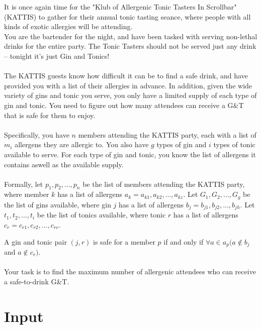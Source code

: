 

\noindent It is once again time for the "Klub of Allergenic Tonic Tasters In Scrollbar" (KATTIS) to gather for their annual tonic tasting seance, where people with all kinds of exotic allergies will be attending. 
\\
\noindent You are the bartender for the night, and have been tasked with serving non-lethal drinks for the entire party. 
The Tonic Tasters should not be served just any drink -- tonight it's just Gin and Tonics!
\\\\
\noindent The KATTIS guests know how difficult it can be to find a safe drink, and have provided you with a list of their allergies in advance.
In addition, given the wide variety of gins and tonic you serve, you only have a limited supply of each type of gin and tonic.
You need to figure out how many attendees can receive a G\&T that is safe for them to enjoy.
\\\\
\noindent Specifically, you have $n$ members attending the KATTIS party, each with a list of $m_i$ allergens they are allergic to.
You also have $g$ types of gin and $i$ types of tonic available to serve.
For each type of gin and tonic, you know the list of allergens it contains aswell as the available supply.
\\\\
\noindent Formally, let $p_1, p_2, \dots, p_n$ be the list of members attending the KATTIS party, 
where member $k$ has a list of allergens $a_k = a_{k1}, a_{k2}, \dots, a_{kz}$. 
Let $G_1, G_2, \dots, G_g$ be the list of gins available, 
where gin $j$ has a list of allergens $b_j = b_{j1}, b_{j2}, \dots, b_{jh}$.
Let $t_1, t_2, \dots, t_i$ be the list of tonics available, 
where tonic $r$ has a list of allergens $c_r = c_{r1}, c_{r2}, \dots, c_{rv}$. 

\noindent A gin and tonic pair $(j,r)$ is safe for a member $p$ if and only if $ \forall a \in {a_p} (a \notin {b_j}$ and $a \notin {c_r})$.
\\\\
\noindent Your task is to find the maximum number of allergenic attendees who can receive a safe-to-drink G\&T.

\section*{Input}

